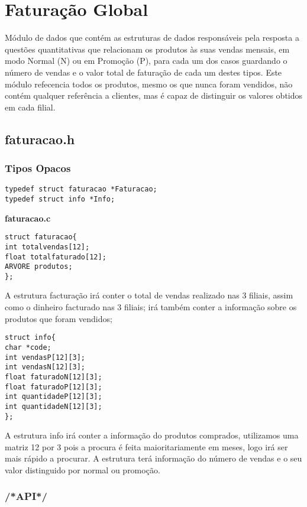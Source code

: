 \section{Faturação Global}

Módulo de dados que contém as estruturas de dados responsáveis pela resposta a questões quantitativas que relacionam os produtos às suas vendas mensais, em modo Normal (N) ou em Promoção (P), para cada um dos casos guardando o número de vendas e o valor total de faturação de cada um destes tipos. Este módulo refecencia todos os produtos, mesmo os que nunca foram vendidos, não contém qualquer referência a clientes, mas é capaz de distinguir os valores obtidos em cada filial. 

\subsection{faturacao.h}

\subsubsection{Tipos Opacos}
\begin{Verbatim}
typedef struct faturacao *Faturacao;
typedef struct info *Info;
\end{Verbatim}

\textbf{faturacao.c}
\begin{verbatim}
struct faturacao{
int totalvendas[12];
float totalfaturado[12];
ARVORE produtos;
};
\end{verbatim}

A estrutura facturação irá conter o total de vendas realizado nas 3 filiais, assim como o dinheiro facturado nas 3 filiais; irá também conter a informação sobre os produtos que foram vendidos; 

\begin{verbatim}
struct info{
char *code;
int vendasP[12][3];
int vendasN[12][3];
float faturadoN[12][3];
float faturadoP[12][3];
int quantidadeP[12][3];
int quantidadeN[12][3];
};
\end{verbatim}

A estrutura info irá conter a informação  do produtos comprados, utilizamos uma matriz 12 por 3 pois a procura é feita maioritariamente em meses, logo irá ser mais rápido a procurar. A estrutura terá informação do número de vendas e o seu valor distinguido por normal ou promoção. 

\subsubsection{/*API*/}

